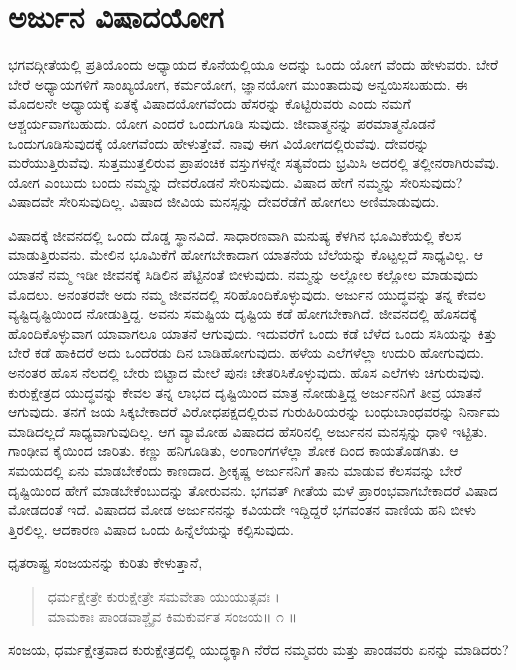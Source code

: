 
\chapter{ಅರ್ಜುನ ವಿಷಾದಯೋಗ}

ಭಗವದ್ಗೀತೆಯಲ್ಲಿ ಪ್ರತಿಯೊಂದು ಅಧ್ಯಾಯದ ಕೊನೆಯಲ್ಲಿಯೂ ಅದನ್ನು ಒಂದು ಯೋಗ ವೆಂದು ಹೇಳುವರು. ಬೇರೆ ಬೇರೆ ಅಧ್ಯಾಯಗಳಿಗೆ ಸಾಂಖ್ಯಯೋಗ, ಕರ್ಮಯೋಗ, ಜ್ಞಾನಯೋಗ ಮುಂತಾದುವು ಅನ್ವಯಿಸಬಹುದು. ಈ ಮೊದಲನೇ ಅಧ್ಯಾಯಕ್ಕೆ ಏತಕ್ಕೆ ವಿಷಾದಯೋಗವೆಂದು ಹೆಸರನ್ನು ಕೊಟ್ಟಿರುವರು ಎಂದು ನಮಗೆ ಆಶ್ಚರ್ಯವಾಗಬಹುದು. ಯೋಗ ಎಂದರೆ ಒಂದುಗೂಡಿ ಸುವುದು. ಜೀವಾತ್ಮನನ್ನು ಪರಮಾತ್ಮನೊಡನೆ ಒಂದುಗೂಡಿಸುವುದಕ್ಕೆ ಯೋಗವೆಂದು ಹೇಳುತ್ತೇವೆ. ನಾವು ಈಗ ವಿಯೋಗದಲ್ಲಿರುವೆವು. ದೇವರನ್ನು ಮರೆಯುತ್ತಿರುವೆವು. ಸುತ್ತಮುತ್ತಲಿರುವ ಪ್ರಾಪಂಚಿಕ ವಸ್ತುಗಳನ್ನೇ ಸತ್ಯವೆಂದು ಭ್ರಮಿಸಿ ಅದರಲ್ಲಿ ತಲ್ಲೀನರಾಗಿರುವೆವು. ಯೋಗ ಎಂಬುದು ಬಂದು ನಮ್ಮನ್ನು ದೇವರೊಡನೆ ಸೇರಿಸುವುದು. ವಿಷಾದ ಹೇಗೆ ನಮ್ಮನ್ನು ಸೇರಿಸುವುದು? ವಿಷಾದವೇ ಸೇರಿಸುವುದಿಲ್ಲ. ವಿಷಾದ ಜೀವಿಯ ಮನಸ್ಸನ್ನು ದೇವರೆಡೆಗೆ ಹೋಗಲು ಅಣಿಮಾಡುವುದು.

ವಿಷಾದಕ್ಕೆ ಜೀವನದಲ್ಲಿ ಒಂದು ದೊಡ್ಡ ಸ್ಥಾನವಿದೆ. ಸಾಧಾರಣವಾಗಿ ಮನುಷ್ಯ ಕೆಳಗಿನ ಭೂಮಿಕೆಯಲ್ಲಿ ಕೆಲಸ ಮಾಡುತ್ತಿರುವನು. ಮೇಲಿನ ಭೂಮಿಕೆಗೆ ಹೋಗಬೇಕಾದಾಗ ಯಾತನೆಯ ಬೆಲೆಯನ್ನು ಕೊಟ್ಟಲ್ಲದೆ ಸಾಧ್ಯವಿಲ್ಲ. ಆ ಯಾತನೆ ನಮ್ಮ ಇಡೀ ಜೀವನಕ್ಕೆ ಸಿಡಿಲಿನ ಪೆಟ್ಟಿನಂತೆ ಬೀಳುವುದು. ನಮ್ಮನ್ನು ಅಲ್ಲೋಲ ಕಲ್ಲೋಲ ಮಾಡುವುದು ಮೊದಲು. ಅನಂತರವೇ ಅದು ನಮ್ಮ ಜೀವನದಲ್ಲಿ ಸರಿಹೊಂದಿಕೊಳ್ಳುವುದು. ಅರ್ಜುನ ಯುದ್ಧವನ್ನು ತನ್ನ ಕೇವಲ ವ್ಯಷ್ಟಿದೃಷ್ಟಿಯಿಂದ ನೋಡುತ್ತಿದ್ದ. ಅವನು ಸಮಷ್ಟಿಯ ದೃಷ್ಟಿಯ ಕಡೆ ಹೋಗಬೇಕಾಗಿದೆ. ಜೀವನದಲ್ಲಿ ಹೊಸದಕ್ಕೆ ಹೊಂದಿಕೊಳ್ಳುವಾಗ ಯಾವಾಗಲೂ ಯಾತನೆ ಆಗುವುದು. ಇದುವರೆಗೆ ಒಂದು ಕಡೆ ಬೆಳೆದ ಒಂದು ಸಸಿಯನ್ನು ಕಿತ್ತು ಬೇರೆ ಕಡೆ ಹಾಕಿದರೆ ಅದು ಒಂದೆರಡು ದಿನ ಬಾಡಿಹೋಗುವುದು. ಹಳೆಯ ಎಲೆಗಳೆಲ್ಲಾ ಉದುರಿ ಹೋಗುವುದು. ಅನಂತರ ಹೊಸ ನೆಲದಲ್ಲಿ ಬೇರು ಬಿಟ್ಟಾದ ಮೇಲೆ ಪುನಃ ಚೇತರಿಸಿಕೊಳ್ಳುವುದು. ಹೊಸ ಎಲೆಗಳು ಚಿಗುರುವುವು. ಕುರುಕ್ಷೇತ್ರದ ಯುದ್ಧವನ್ನು ಕೇವಲ ತನ್ನ ಲಾಭದ ದೃಷ್ಟಿಯಿಂದ ಮಾತ್ರ ನೋಡುತ್ತಿದ್ದ ಅರ್ಜುನನಿಗೆ ತೀವ್ರ ಯಾತನೆ ಆಗುವುದು. ತನಗೆ ಜಯ ಸಿಕ್ಕಬೇಕಾದರೆ ವಿರೋಧಪಕ್ಷದಲ್ಲಿರುವ ಗುರುಹಿರಿಯರನ್ನು ಬಂಧುಬಾಂಧವರನ್ನು ನಿರ್ನಾಮ ಮಾಡಿದಲ್ಲದೆ ಸಾಧ್ಯವಾಗುವುದಿಲ್ಲ. ಆಗ ವ್ಯಾಮೋಹ ವಿಷಾದದ ಹೆಸರಿನಲ್ಲಿ ಅರ್ಜುನನ ಮನಸ್ಸನ್ನು ಧಾಳಿ ಇಟ್ಟಿತು. ಗಾಂಢೀವ ಕೈಯಿಂದ ಜಾರಿತು. ಕಣ್ಣು ಹನಿಗೂಡಿತು, ಅಂಗಾಂಗಗಳೆಲ್ಲಾ ಶೋಕ ದಿಂದ ಕಾಯತೊಡಗಿತು. ಆ ಸಮಯದಲ್ಲಿ ಏನು ಮಾಡಬೇಕೆಂದು ಕಾಣದಾದ. ಶ್ರೀಕೃಷ್ಣ ಅರ್ಜುನನಿಗೆ ತಾನು ಮಾಡುವ ಕೆಲಸವನ್ನು ಬೇರೆ ದೃಷ್ಟಿಯಿಂದ ಹೇಗೆ ಮಾಡಬೇಕೆಂಬುದನ್ನು ತೋರುವನು. ಭಗವತ್ ಗೀತೆಯ ಮಳೆ ಪ್ರಾರಂಭವಾಗಬೇಕಾದರೆ ವಿಷಾದ ಮೋಡದಂತೆ ಇದೆ. ವಿಷಾದದ ಮೋಡ ಅರ್ಜುನನನ್ನು ಕವಿಯದೇ ಇದ್ದಿದ್ದರೆ ಭಗವಂತನ ವಾಣಿಯ ಹನಿ ಬೀಳು ತ್ತಿರಲಿಲ್ಲ. ಆದಕಾರಣ ವಿಷಾದ ಒಂದು ಹಿನ್ನೆಲೆಯನ್ನು ಕಲ್ಪಿಸುವುದು.

ಧೃತರಾಷ್ಟ್ರ ಸಂಜಯನನ್ನು ಕುರಿತು ಕೇಳುತ್ತಾನೆ,

\begin{verse}
ಧರ್ಮಕ್ಷೇತ್ರೇ ಕುರುಕ್ಷೇತ್ರೇ ಸಮವೇತಾ ಯುಯುತ್ಸವಃ ।\\ಮಾಮಕಾಃ ಪಾಂಡವಾಶ್ಚೈವ ಕಿಮಕುರ್ವತ ಸಂಜಯ\num{॥ ೧ ॥}
\end{verse}

{\small ಸಂಜಯ, ಧರ್ಮಕ್ಷೇತ್ರವಾದ ಕುರುಕ್ಷೇತ್ರದಲ್ಲಿ ಯುದ್ಧಕ್ಕಾಗಿ ನೆರೆದ ನಮ್ಮವರು ಮತ್ತು ಪಾಂಡವರು ಏನನ್ನು ಮಾಡಿದರು?}

